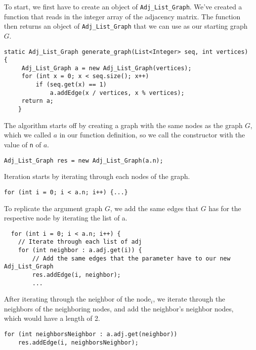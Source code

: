 \documentclass[11pt]{article}
\begin{document}
To start, we first have to create an object of \verb|Adj_List_Graph|. We've created a function that reads in the integer array of the adjacency matrix. The function then returns an object of \verb|Adj_List_Graph| that we can use as our starting graph $G$.
\begin{lstlisting}
static Adj_List_Graph generate_graph(List<Integer> seq, int vertices) {
     Adj_List_Graph a = new Adj_List_Graph(vertices);
     for (int x = 0; x < seq.size(); x++)
         if (seq.get(x) == 1)
             a.addEdge(x / vertices, x % vertices);
     return a;
    }
\end{lstlisting}

The algorithm starts off by creating a graph with the same nodes as the graph $G$, which we called $a$ in our function definition, so we call the constructor with the value of \verb|n| of $a$.
\begin{lstlisting}
Adj_List_Graph res = new Adj_List_Graph(a.n);
\end{lstlisting}

Iteration starts by iterating through each nodes of the graph.
\begin{lstlisting}
for (int i = 0; i < a.n; i++) {...}
\end{lstlisting}


To replicate the argument graph $G$, we add the same edges that \(G\) has for the respective node by iterating the list of a.

\begin{lstlisting}
  for (int i = 0; i < a.n; i++) {
    // Iterate through each list of adj
    for (int neighbor : a.adj.get(i)) {
        // Add the same edges that the parameter have to our new Adj_List_Graph
        res.addEdge(i, neighbor);
        ...
\end{lstlisting}

After iterating through the neighbor of the node$_{i}$, we iterate through the neighbors of the neighboring nodes, and add the neighbor's neighbor nodes, which would have a length of 2.
\begin{lstlisting}
for (int neighborsNeighbor : a.adj.get(neighbor))
    res.addEdge(i, neighborsNeighbor);
\end{lstlisting}
\end{document}
